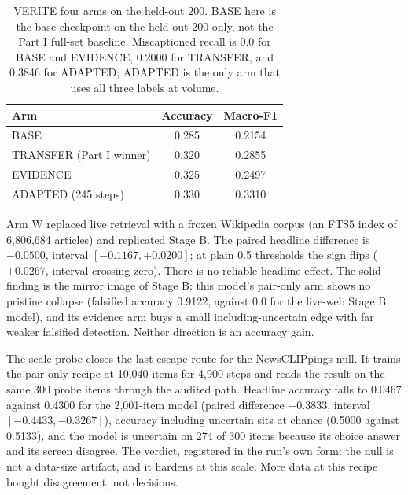 \documentclass[conference]{IEEEtran}
\begin{document}
\begin{table}[t]
\centering
\caption{VERITE four arms on the held-out 200. BASE here is the base checkpoint on the held-out 200 only, not the Part I full-set baseline. Miscaptioned recall is 0.0 for BASE and EVIDENCE, 0.2000 for TRANSFER, and 0.3846 for ADAPTED; ADAPTED is the only arm that uses all three labels at volume.}
\label{tab:verite4}
\begin{tabular}{lcc}
\toprule
Arm & Accuracy & Macro-F1 \\
\midrule
BASE & 0.285 & 0.2154 \\
TRANSFER (Part I winner) & 0.320 & 0.2855 \\
EVIDENCE & 0.325 & 0.2497 \\
ADAPTED (245 steps) & 0.330 & 0.3310 \\
\bottomrule
\end{tabular}
\end{table}

Arm W replaced live retrieval with a frozen Wikipedia corpus (an FTS5 index of 6,806,684 articles) and replicated Stage B. The paired headline difference is $-0.0500$, interval $[-0.1167, +0.0200]$; at plain 0.5 thresholds the sign flips ($+0.0267$, interval crossing zero). There is no reliable headline effect. The solid finding is the mirror image of Stage B: this model's pair-only arm shows no pristine collapse (falsified accuracy 0.9122, against 0.0 for the live-web Stage B model), and its evidence arm buys a small including-uncertain edge with far weaker falsified detection. Neither direction is an accuracy gain.

The scale probe closes the last escape route for the NewsCLIPpings null. It trains the pair-only recipe at 10,040 items for 4,900 steps and reads the result on the same 300 probe items through the audited path. Headline accuracy falls to 0.0467 against 0.4300 for the 2,001-item model (paired difference $-0.3833$, interval $[-0.4433, -0.3267]$), accuracy including uncertain sits at chance (0.5000 against 0.5133), and the model is uncertain on 274 of 300 items because its choice answer and its screen disagree. The verdict, registered in the run's own form: the null is not a data-size artifact, and it hardens at this scale. More data at this recipe bought disagreement, not decisions.
\end{document}
